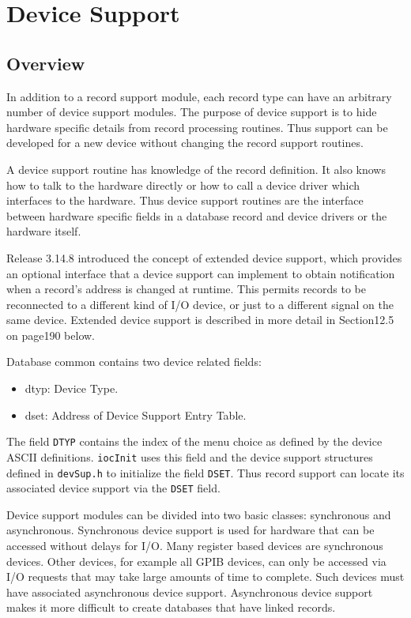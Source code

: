 \chapter{Device Support}

\section{Overview}

In addition to a record support module, each record type can have an arbitrary number of device support modules. The 
purpose of device support is to hide hardware specific details from record processing routines. Thus support can be 
developed for a new device without changing the record support routines.

A device support routine has knowledge of the record definition. It also knows how to talk to the hardware directly or how 
to call a device driver which interfaces to the hardware. Thus device support routines are the interface between hardware 
specific fields in a database record and device drivers or the hardware itself.

Release 3.14.8 introduced the concept of extended device support, which provides an optional interface that a device 
support can implement to obtain notification when a record's address is changed at runtime. This permits records to be 
reconnected to a different kind of I/O device, or just to a different signal on the same device. Extended device support is 
described in more detail in Section12.5 on page190 below.

Database common contains two device related fields:

\begin{itemize}
\item {}dtyp:  Device Type.

\item {}dset:  Address of Device Support Entry Table.

\end{itemize}

The field \verb|DTYP| contains the index of the menu choice as defined by the device ASCII definitions. \verb|iocInit| uses this 
field and the device support structures defined in \verb|devSup.h| to initialize the field \verb|DSET|. Thus record support can locate 
its associated device support via the \verb|DSET| field.

Device support modules can be divided into two basic classes: synchronous and asynchronous. Synchronous device 
support is used for hardware that can be accessed without delays for I/O. Many register based devices are synchronous 
devices. Other devices, for example all GPIB devices, can only be accessed via I/O requests that may take large amounts 
of time to complete. Such devices must have associated asynchronous device support. Asynchronous device support 
makes it more difficult to create databases that have linked records.

